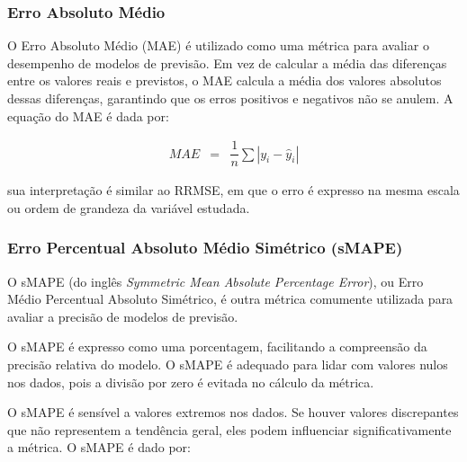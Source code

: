 \subsubsection{Erro Absoluto M\'edio}

O Erro Absoluto Médio (MAE) é utilizado como uma métrica para avaliar o desempenho de modelos de previsão. Em vez de calcular a média das diferenças entre os valores reais e previstos, o MAE calcula a média dos valores absolutos dessas diferenças, garantindo que os erros positivos e negativos não se anulem.
A equação do MAE é dada por:

\begin{eqnarray}
	M A E &=& \dfrac{1}{n} \sum\left|y_i-\hat{y}_i\right|\label{eq:mae}
\end{eqnarray}

\noindent sua interpretação é similar ao RRMSE, em que o erro é expresso na mesma escala ou ordem de grandeza da variável estudada.

%
%



\subsubsection{Erro Percentual Absoluto M\'edio Sim\'etrico (sMAPE)}


O sMAPE (do inglês \textit{Symmetric Mean Absolute Percentage Error}), ou Erro Médio Percentual Absoluto Simétrico, é outra métrica comumente utilizada para avaliar a precisão de modelos de previsão. 

O sMAPE é expresso como uma porcentagem, facilitando a compreensão da precisão relativa do modelo.  O sMAPE é adequado para lidar com valores nulos nos dados, pois a divisão por zero é evitada no cálculo da métrica.


O sMAPE é sensível a valores extremos nos dados. Se houver valores discrepantes que não representem a tendência geral, eles podem influenciar significativamente a métrica.	
O sMAPE é dado por:



